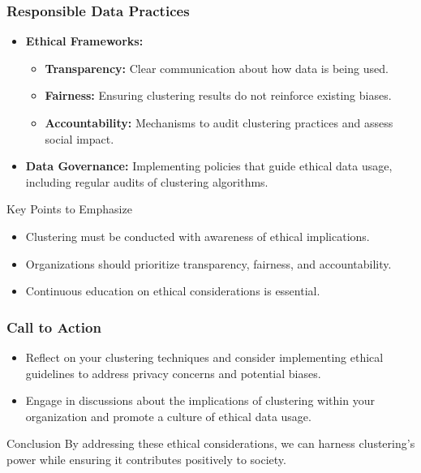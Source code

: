 \documentclass[aspectratio=169]{beamer}
\begin{document}
\begin{frame}[fragile]
    \frametitle{Responsible Data Practices}
    \begin{itemize}
        \item \textbf{Ethical Frameworks:}
        \begin{itemize}
            \item \textbf{Transparency:} Clear communication about how data is being used.
            \item \textbf{Fairness:} Ensuring clustering results do not reinforce existing biases.
            \item \textbf{Accountability:} Mechanisms to audit clustering practices and assess social impact.
        \end{itemize}
        \item \textbf{Data Governance:} Implementing policies that guide ethical data usage, including regular audits of clustering algorithms.
    \end{itemize}
    \begin{block}{Key Points to Emphasize}
        \begin{itemize}
            \item Clustering must be conducted with awareness of ethical implications.
            \item Organizations should prioritize transparency, fairness, and accountability.
            \item Continuous education on ethical considerations is essential.
        \end{itemize}
    \end{block}
\end{frame}

\begin{frame}[fragile]
    \frametitle{Call to Action}
    \begin{itemize}
        \item Reflect on your clustering techniques and consider implementing ethical guidelines to address privacy concerns and potential biases.
        \item Engage in discussions about the implications of clustering within your organization and promote a culture of ethical data usage.
    \end{itemize}
    \begin{block}{Conclusion}
        By addressing these ethical considerations, we can harness clustering's power while ensuring it contributes positively to society.
    \end{block}
\end{frame}
\end{document}
